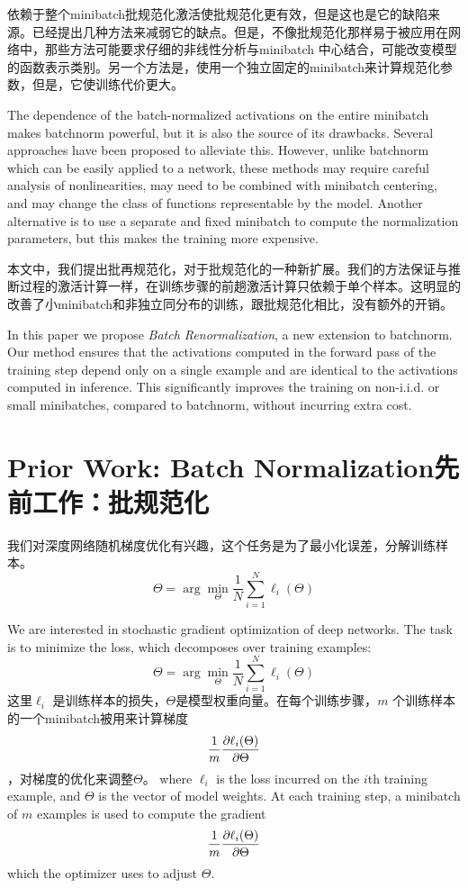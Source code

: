 依赖于整个minibatch批规范化激活使批规范化更有效，但是这也是它的缺陷来源。已经提出几种方法来减弱它的缺点\cite{weightnorm,layernorm,normprop}。但是，不像批规范化那样易于被应用在网络中，那些方法可能要求仔细的非线性分析与minibatch 中心结合，可能改变模型的函数表示类别。另一个方法是\cite{gan}，使用一个独立固定的minibatch来计算规范化参数，但是，它使训练代价更大。

The dependence of the batch-normalized activations on the entire minibatch makes batchnorm powerful, but it is also the source of its drawbacks. Several approaches \cite{weightnorm,layernorm,normprop} have been proposed to alleviate this. However, unlike batchnorm which can be easily applied to a network, these methods may require careful analysis of nonlinearities, may need to be combined with  minibatch centering, and may change the class of functions representable by the model. Another alternative \cite{gan} is to use a separate and fixed minibatch to compute the normalization parameters, but this makes the training more expensive.

本文中，我们提出批再规范化，对于批规范化的一种新扩展。我们的方法保证与推断过程的激活计算一样，在训练步骤的前趟激活计算只依赖于单个样本。这明显的改善了小minibatch和非独立同分布的训练，跟批规范化相比，没有额外的开销。

In this paper we propose {\em Batch Renormalization}, a new extension to batchnorm. Our method ensures that the activations computed in the forward pass of the training step depend only on a single example and are identical to the activations computed in inference. This significantly improves the training on non-i.i.d. or small minibatches, compared to batchnorm, without incurring extra cost.

\section{Prior Work: Batch Normalization先前工作：批规范化}
我们对深度网络随机梯度优化有兴趣，这个任务是为了最小化误差，分解训练样本。
$$\Theta = \arg \min_\Theta
\frac{1}{N}\sum_{i=1}^N \ell_i(\Theta)$$

We are interested in stochastic gradient optimization of deep networks. The task is to minimize the loss, which decomposes over training examples:
$$\Theta = \arg \min_\Theta
\frac{1}{N}\sum_{i=1}^N \ell_i(\Theta)$$
这里$\ell_i$ 是训练样本的损失，$\Theta$是模型权重向量。在每个训练步骤，$m$ 个训练样本的一个minibatch被用来计算梯度$$\frac{1}{m} \frac{\partial  \ell_i(\Theta)}{\partial  \Theta}$$，对梯度的优化来调整$\Theta$。
where $\ell_i$ is the loss incurred on the $i$th training example, and $\Theta$ is the vector of model weights. At each training step, a minibatch of $m$ examples is used to compute the  gradient
$$\frac{1}{m} \frac{\partial  \ell_i(\Theta)}{\partial  \Theta}$$
which the optimizer uses to adjust $\Theta$.

